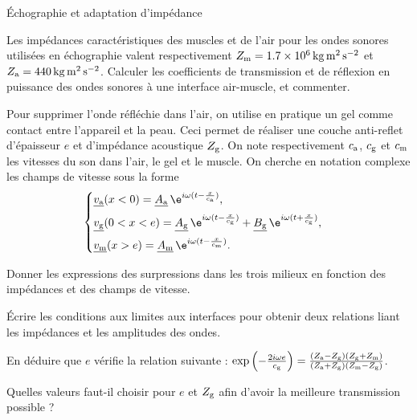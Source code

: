 \begin{exo}[PC][3][colle]{Échographie et adaptation d'impédance}
\begin{quest}
\item Les impédances caractéristiques des muscles et de l'air pour les ondes sonores utilisées en échographie valent respectivement $Z_{\rm{m}}=\SI{1,7e6}{kg.m^{2}.s^{-2}}$ et $Z_{\rm{a}}=\SI{440}{kg.m^{2}.s^{-2}}$. Calculer les coefficients de transmission et de réflexion en puissance des ondes sonores à une interface air-muscle, et commenter.
\end{quest}
 Pour supprimer l'onde réfléchie dans l'air, on utilise en pratique un gel comme contact entre l'appareil et la peau. Ceci permet de réaliser une couche anti-reflet d'épaisseur $e$ et d'impédance acoustique $Z_{\rm{g}}$. On note respectivement $c_{\rm{a}}$, $c_{\rm{g}}$ et $c_{\rm{m}}$ les vitesses du son dans l'air, le gel et le muscle. On cherche en notation complexe les champs de vitesse sous la forme \begin{equation}
\begin{cases}
\underline{v_{\rm{a}}}(x<0)=\underline{A_{\rm{a}}}\,\e^{i\omega (t-\frac{x}{c_{\rm{a}}})},\\[2mm]
\underline{v_{\rm{g}}}(0<x<e)=\underline{A_{\rm{g}}}\,\e^{i\omega (t-\frac{x}{c_{\rm{g}}})}+\underline{B_{\rm{g}}}\,\e^{i\omega (t+\frac{x}{c_{\rm{g}}})},\\[2mm]
\underline{v_{\rm{m}}}(x>e)=\underline{A_{\rm{m}}}\,\e^{i\omega (t-\frac{x}{c_{\rm{m}}})}.
\end{cases}
\end{equation}
\begin{quest}
\item Donner les expressions des surpressions dans les trois milieux en fonction des impédances et des champs de vitesse.
\item Écrire les conditions aux limites aux interfaces pour obtenir deux relations liant les impédances et les amplitudes des ondes.
\item En déduire que $e$ vérifie la relation suivante : $\exp\left(-\frac{2i\omega e}{c_{\rm{g}}}\right)=\frac{(Z_{\rm{a}}-Z_{\rm{g}})(Z_{\rm{g}}+Z_{\rm{m}})}{(Z_{\rm{a}}+Z_{\rm{g}})(Z_{\rm{m}}-Z_{\rm{g}})}$.
\item Quelles valeurs faut-il choisir pour $e$ et $Z_{\rm{g}}$ afin d'avoir la meilleure transmission possible ?
\end{quest}
\end{exo}

